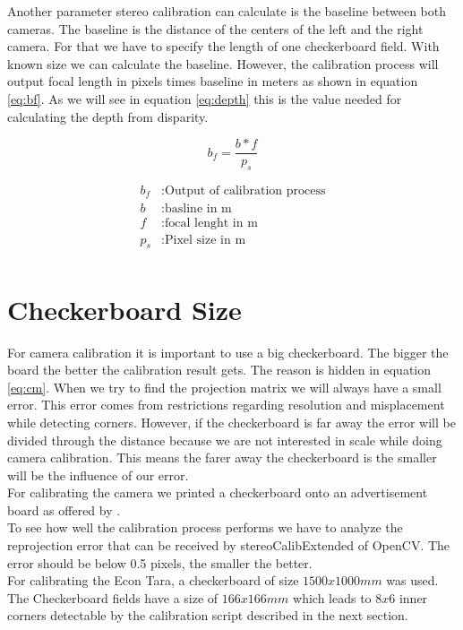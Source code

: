 \documentclass[11pt,a4paper,titlepage,oneside]{report}
\begin{document}
Another parameter stereo calibration can calculate is the baseline between both cameras. The baseline is the distance of the centers of the left and the right camera. For that we have to specify the length of one checkerboard field. With known size we can calculate the baseline. However, the calibration process will output focal length in pixels times baseline in meters as shown in equation \ref{eq:bf}. As we will see in equation \ref{eq:depth} this is the value needed for calculating the depth from disparity.

\begin{equation}\label{eq:bf}
	b_f=\frac{b*f}{p_s}
\end{equation}

\begin{align*}
	b_f &:	\text{Output of calibration process}\\
	b &:		\text{basline in m}\\
	f &:		\text{focal lenght in m}\\
	p_s &:	\text{Pixel size in m}\\
\end{align*}

\section{Checkerboard Size}

For camera calibration it is important to use a big checkerboard. The bigger the board the better the calibration result gets. The reason is hidden in equation \ref{eq:cm}. When we try to find the projection matrix we will always have a small error. This error comes from restrictions regarding resolution and misplacement while detecting corners. However, if the checkerboard is far away the error will be divided through the distance because we are not interested in scale while doing camera calibration. This means the farer away the checkerboard is the smaller will be the influence of our error.\\
For calibrating the camera we printed a checkerboard onto an advertisement board as offered by \cite{mydisplay}.\\
To see how well the calibration process performs we have to analyze the reprojection error that can be received by stereoCalibExtended of OpenCV. The error should be below 0.5 pixels, the smaller the better.\\
For calibrating the Econ Tara, a checkerboard of size $1500x1000mm$ was used. The Checkerboard fields have a size of $166x166mm$ which leads to $8x6$ inner corners detectable by the calibration script described in the next section.
\end{document}
